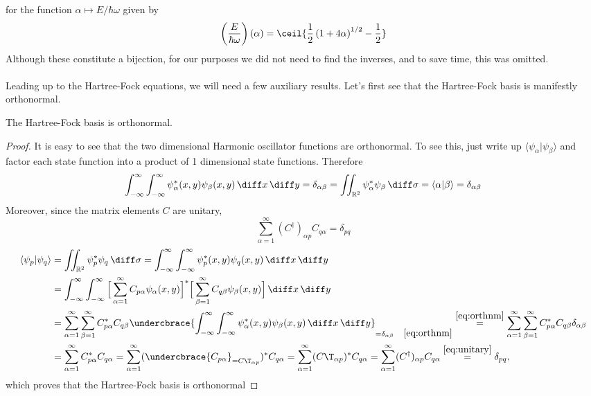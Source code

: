 \documentclass[11pt,english,a4paper]{article}
\begin{document}
for the function $\alpha \mapsto E/\hbar\omega$ given by
\[
\left(\frac{E}{\hbar \omega} \right)(\alpha) = \ceil{\frac{1}{2}\left( 1 + 4\alpha \right)^{1/2} - \frac{1}{2} }
\]
Although these constitute a bijection, for our purposes we did not need to find the inverses, and to save time, this was omitted.\\
\\
Leading up to the Hartree-Fock equations, we will need a few auxiliary results. Let's first see that the Hartree-Fock basis is manifestly orthonormal.
\begin{prop}
The Hartree-Fock basis is orthonormal. \label{thm:hforth}
\end{prop}
\begin{proof}
It is easy to see that the two dimensional Harmonic oscillator functions are orthonormal. To see this, just write up $\langle \psi_{  \alpha} | \psi_{  \beta} \rangle$ and factor each state function into a product of 1 dimensional state functions. Therefore
\begin{equation}
\int_{- \infty}^\infty\int_{- \infty}^\infty \psi_\alpha^*(x,y)  \psi_\beta(x,y) \, \diff x \, \diff y = \delta_{  \alpha\beta} = \iint_{  \mathbb{R}^2} \psi_{  \alpha}^* \psi_{  \beta} \, \diff \sigma = \langle \alpha|\beta \rangle =\delta_{  \alpha \beta} \label{eq:orthnm}
\end{equation}
Moreover, since the matrix elements $C$ are unitary,
\begin{equation}
\sum_{\alpha=1}^\infty (C^\dagger)_{  \alpha p }C_{q\alpha} = \delta_{  pq} \label{eq:unitary}
\end{equation}
\begin{align*}
\langle \psi_{  p} | \psi_{  q} \rangle &= \iint_{  \mathbb{R}^2} \psi_{  p}^* \psi_{  q} \, \diff \sigma = \int_{- \infty}^\infty\int_{- \infty}^\infty \psi_{  p}^*(x,y) \psi_{  q}(x,y) \, \diff x \, \diff y \\
&= \int_{- \infty}^\infty\int_{- \infty}^\infty \Big[ \sum_{\alpha=1}^\infty C_{p\alpha} \psi_\alpha(x,y) \Big]^* \Big[ \sum_{\beta=1}^\infty C_{q\beta} \psi_\beta(x,y) \Big] \, \diff x \, \diff y \\
&= \sum_{\alpha=1}^\infty\sum_{\beta=1}^\infty C_{p\alpha}^*C_{q\beta}\undercbrace{\int_{- \infty}^\infty\int_{- \infty}^\infty \psi_\alpha^*(x,y)  \psi_\beta(x,y) \, \diff x \, \diff y}_{= \delta_{  \alpha\beta} \quad \eqref{eq:orthnm}}  \stackrel{\eqref{eq:orthnm}}{=} \sum_{\alpha=1}^\infty\sum_{\beta=1}^\infty C_{p\alpha}^*C_{q\beta}\delta_{  \alpha\beta} \\
&= \sum_{\alpha=1}^\infty C_{p\alpha}^*C_{q\alpha} 
= \sum_{\alpha=1}^\infty (\undercbrace{C_{p\alpha}}_{={C\T}_{\alpha p }})^*C_{q\alpha} = \sum_{\alpha=1}^\infty ({C\T}_{\alpha p })^*C_{q\alpha} = \sum_{\alpha=1}^\infty (C^\dagger)_{  \alpha p }C_{q\alpha} \stackrel{\eqref{eq:unitary}}{=} \delta_{  pq},
\end{align*}
which proves that the Hartree-Fock basis is orthonormal
\end{proof}
\end{document}
